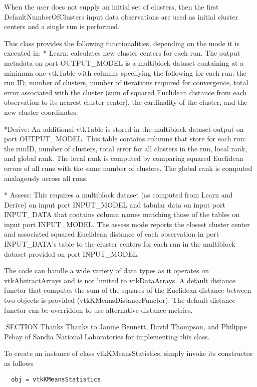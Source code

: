  When the user does not supply an initial set of clusters, then the first 
 DefaultNumberOfClusters input data observations are used as initial cluster 
 centers and a single run is performed.


 This class provides the following functionalities, depending on the 
 mode it is executed in:
 * Learn: calculates new cluster centers for each run.  The output metadata on 
   port OUTPUT\_MODEL is a multiblock dataset containing at a minimum
   one vtkTable with columns specifying the following for each run:
   the run ID, number of clusters, number of iterations required for convergence, 
   total error associated with the cluster (sum of squared Euclidean distance from each observation
   to its nearest cluster center), the cardinality of the cluster, and the new
   cluster coordinates.

 *Derive:  An additional vtkTable is stored in the multiblock dataset output on port OUTPUT\_MODEL.
   This table contains columns that store for each run: the runID, number of clusters, 
   total error for all clusters in the run, local rank, and global rank.
   The local rank is computed by comparing squared Euclidean errors of all runs with
   the same number of clusters.  The global rank is computed analagously across all runs.

 * Assess: This requires a multiblock dataset (as computed from Learn and Derive) on input port INPUT\_MODEL
   and tabular data on input port INPUT\_DATA that contains column names matching those
   of the tables on input port INPUT\_MODEL. The assess mode reports the closest cluster center
   and associated squared Euclidean distance of each observation in port INPUT\_DATA's table to the cluster centers for
   each run in the multiblock dataset provided on port INPUT\_MODEL.
  
 The code can handle a wide variety of data types as it operates on vtkAbstractArrays 
 and is not limited to vtkDataArrays.  A default distance functor that
 computes the sum of the squares of the Euclidean distance between two objects is provided 
 (vtkKMeansDistanceFunctor). The default distance functor can be overridden to use alternative distance metrics.

 .SECTION Thanks
 Thanks to Janine Bennett, David Thompson, and Philippe Pebay of
 Sandia National Laboratories for implementing this class.

To create an instance of class vtkKMeansStatistics, simply
invoke its constructor as follows
\begin{verbatim}
  obj = vtkKMeansStatistics
\end{verbatim}
